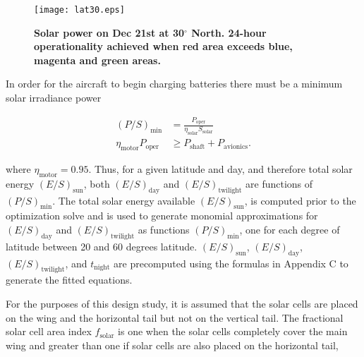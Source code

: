 \begin{figure}[H]
	\begin{center}
	\texttt{[image: lat30.eps]}
    \caption{\textbf{Solar power on Dec 21st at 30$^{\circ}$ North. 24-hour operationality achieved when red area exceeds blue, magenta and green areas. }}
	\label{f:lat30}
	\end{center}
\end{figure}

In order for the aircraft to begin charging batteries there must be a minimum solar irradiance power

\begin{align}
    (P/S)_{\text{min}} &= \frac{P_{\text{oper}}}{\eta_{\text{solar}} S_{\text{solar}}} \\
    \eta_{\text{motor}} P_{\text{oper}} &\geq P_{\text{shaft}} + P_{\text{avionics}}.
\end{align}

where $\eta_{\text{motor}} = 0.95$. 
Thus, for a given latitude and day, and therefore total solar energy $(E/S)_{\text{sun}}$, both $(E/S)_{\text{day}}$ and $(E/S)_{\text{twilight}}$ are functions of $(P/S)_{\text{min}}$.  
The total solar energy available $(E/S)_{\text{sun}}$, is computed prior to the optimization solve and is used to generate monomial approximations for $(E/S)_{\text{day}}$ and $(E/S)_{\text{twilight}}$ as functions $(P/S)_{\text{min}}$, one for each degree of latitude between 20 and 60 degrees latitude. 
$(E/S)_{\text{sun}}$, $(E/S)_{\text{day}}$, $(E/S)_{\text{twilight}}$, and $t_{\text{night}}$ are precomputed using the formulas in Appendix C to generate the fitted equations. 
% 


For the purposes of this design study, it is assumed that the solar cells are placed on the wing and the horizontal tail but not on the vertical tail. 
The fractional solar cell area index $f_{\text{solar}}$ is one when the solar cells completely cover the main wing and greater than one if solar cells are also placed on the horizontal tail,


